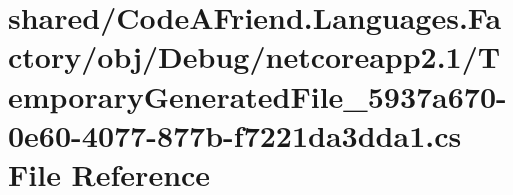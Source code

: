 \hypertarget{shared_2_code_a_friend_8_languages_8_factory_2obj_2_debug_2netcoreapp2_81_2_temporary_generated_a4642b6adffdc7d4c4c5d15f7dce9aa3}{}\section{shared/\+Code\+A\+Friend.Languages.\+Factory/obj/\+Debug/netcoreapp2.1/\+Temporary\+Generated\+File\+\_\+5937a670-\/0e60-\/4077-\/877b-\/f7221da3dda1.cs File Reference}
\label{shared_2_code_a_friend_8_languages_8_factory_2obj_2_debug_2netcoreapp2_81_2_temporary_generated_a4642b6adffdc7d4c4c5d15f7dce9aa3}
